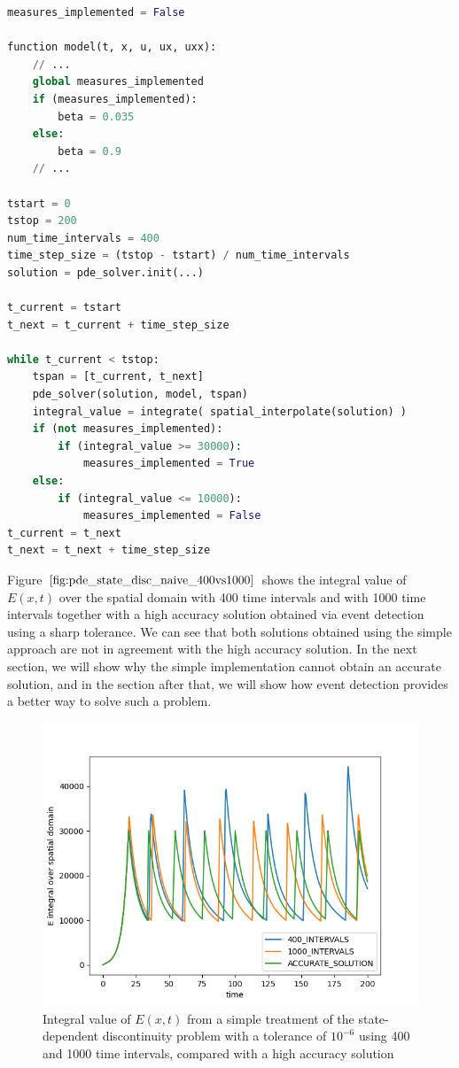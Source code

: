 \documentclass{article}
\begin{document}
\begin{minipage}{\linewidth}
\begin{lstlisting}[language=Python]
measures_implemented = False

function model(t, x, u, ux, uxx):
	// ...
	global measures_implemented
	if (measures_implemented):
		beta = 0.035
	else:
		beta = 0.9
	// ...

tstart = 0
tstop = 200
num_time_intervals = 400
time_step_size = (tstop - tstart) / num_time_intervals
solution = pde_solver.init(...)

t_current = tstart
t_next = t_current + time_step_size

while t_current < tstop:
	tspan = [t_current, t_next]
	pde_solver(solution, model, tspan)
	integral_value = integrate( spatial_interpolate(solution) )
	if (not measures_implemented):
		if (integral_value >= 30000): 
			measures_implemented = True
	else:
		if (integral_value <= 10000):
			measures_implemented = False
t_current = t_next
t_next = t_next + time_step_size
\end{lstlisting}
\end{minipage} 

Figure $\ref{fig:pde_state_disc_naive_400vs1000}$ shows the integral value of $E(x, t)$ over the spatial domain with 400 time intervals and with 1000 time intervals together with a high accuracy solution obtained via event detection using a sharp tolerance. We can see that both solutions obtained using the simple approach are not in agreement with the high accuracy solution. In the next section, we will show why the simple implementation cannot obtain an accurate solution, and in the section after that, we will show how event detection provides a better way to solve such a problem.

\begin{figure}[H]
\centering
\includegraphics[width=0.7\linewidth]{./figures/pde_state_disc_naive_400vs1000}
\caption{Integral value of $E(x, t)$ from a simple treatment of the state-dependent discontinuity problem with a tolerance of $10^{-6}$ using 400 and 1000 time intervals, compared with a high accuracy solution}
\label{fig:pde_state_disc_naive_400vs1000}
\end{figure}
\end{document}
